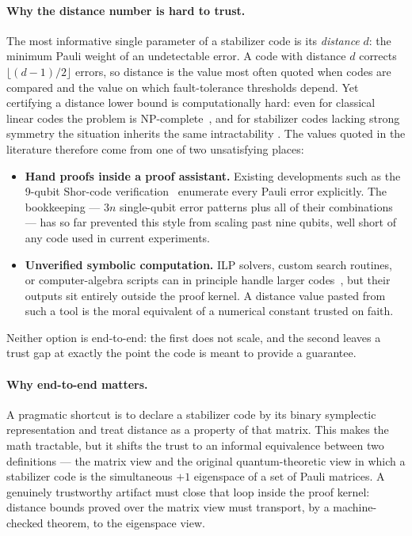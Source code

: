 \paragraph{Why the distance number is hard to trust.} The most informative
single parameter of a stabilizer code is its \emph{distance} $d$: the minimum
Pauli weight of an undetectable error. A code with distance $d$ corrects
$\lfloor(d-1)/2\rfloor$ errors, so distance is the value most often quoted when
codes are compared and the value on which fault-tolerance thresholds depend. Yet
certifying a distance lower bound is computationally hard: even for classical
linear codes the problem is NP-complete~\cite{vardy2002intractability}, and for
stabilizer codes lacking strong symmetry the situation inherits the same
intractability \cite{Kapshikar_2023}. The values quoted in the literature therefore come from one of
two unsatisfying places:
\begin{itemize}[leftmargin=1.5em]
    \item \textbf{Hand proofs inside a proof assistant.} Existing developments
    such as the 9-qubit Shor-code verification~\cite{feng-9-qubits} enumerate
    every Pauli error explicitly. The bookkeeping --- $3n$ single-qubit error
    patterns plus all of their combinations --- has so far prevented this style
    from scaling past nine qubits, well short of any code used in current
    experiments.
    \item \textbf{Unverified symbolic computation.} ILP solvers, custom search
    routines, or computer-algebra scripts can in principle handle larger codes~\cite{webster2026distancefindingalgorithmsquantumcodes}, 
    but their outputs sit entirely outside the proof kernel. A distance value
    pasted from such a tool is the moral equivalent of a numerical constant
    trusted on faith.
\end{itemize}
Neither option is end-to-end: the first does not scale, and the second leaves a
trust gap at exactly the point the code is meant to provide a guarantee.

\paragraph{Why end-to-end matters.} A pragmatic shortcut is to declare a
stabilizer code by its binary symplectic representation and treat distance as a
property of that matrix. This makes the math tractable, but it shifts the trust
to an informal equivalence between two definitions --- the matrix view and the
original quantum-theoretic view in which a stabilizer code is the simultaneous
$+1$ eigenspace of a set of Pauli matrices. A genuinely trustworthy artifact
must close that loop inside the proof kernel: distance bounds proved over the
matrix view must transport, by a machine-checked theorem, to the eigenspace
view.


